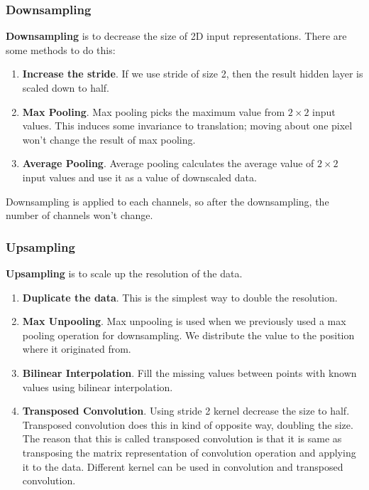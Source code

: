 \documentclass{article}
\begin{document}
        \subsubsection{Downsampling}
            \textbf{Downsampling} is to decrease the size of 2D input representations.
            There are some methods to do this:
            \begin{enumerate}
                \item \textbf{Increase the stride}. If we use stride of size 2, then the result hidden layer is scaled down to half.
                \item \textbf{Max Pooling}. Max pooling picks the maximum value from $2 \times 2$ input values. This induces some invariance to translation; moving about one pixel won't change the result of max pooling.
                \item \textbf{Average Pooling}. Average pooling calculates the average value of $2 \times 2$ input values and use it as a value of downscaled data.
            \end{enumerate}
            Downsampling is applied to each channels, so after the downsampling, the number of channels won't change.
        \subsubsection{Upsampling}
            \textbf{Upsampling} is to scale up the resolution of the data.
            \begin{enumerate}
                \item \textbf{Duplicate the data}. This is the simplest way to double the resolution.
                \item \textbf{Max Unpooling}. Max unpooling is used when we previously used a max pooling operation for downsampling.
                    We distribute the value to the position where it originated from.
                \item \textbf{Bilinear Interpolation}. Fill the missing values between points with known values using bilinear interpolation.
                \item \textbf{Transposed Convolution}. Using stride 2 kernel decrease the size to half. Transposed convolution does this in kind of opposite way, doubling the size.
                    The reason that this is called transposed convolution is that it is same as transposing the matrix representation of convolution operation and applying it to the data.
                    Different kernel can be used in convolution and transposed convolution.
            \end{enumerate}
\end{document}
